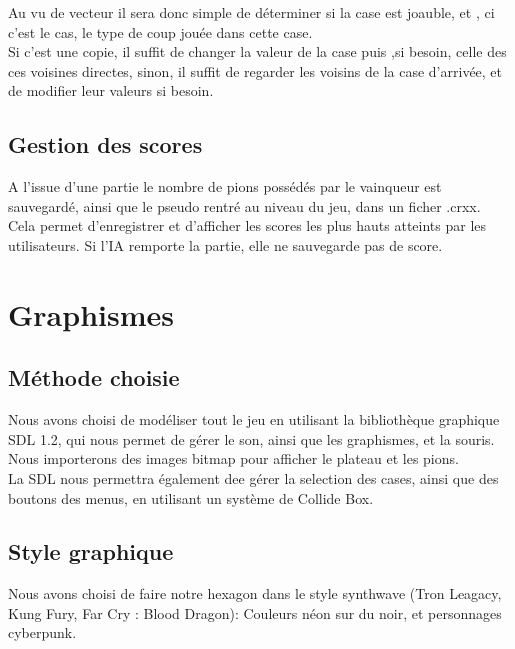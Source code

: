\documentclass{report}
\begin{document}
	Au vu de vecteur il sera donc simple de déterminer si la case est joauble, et , ci c'est le cas, le type de coup jouée dans cette case.\\
	Si c'est une copie, il suffit de changer la valeur de la case puis ,si besoin, celle des ces voisines directes, sinon, il suffit de regarder les voisins de la case d'arrivée, et de modifier leur valeurs si besoin.

	\subsection{Gestion des scores}
	
	A l'issue d'une partie le nombre de pions possédés par le vainqueur est sauvegardé, ainsi que le pseudo rentré au niveau du jeu, dans un ficher .crxx.
	Cela permet d'enregistrer et d'afficher les scores les plus hauts atteints par les utilisateurs. Si l'IA remporte la partie, elle ne sauvegarde pas de score. 


\section{Graphismes}
	\subsection{Méthode choisie}
	
		Nous avons choisi de modéliser tout le jeu en utilisant la bibliothèque graphique SDL 1.2, qui nous permet de gérer le son, ainsi que les graphismes, et la souris. Nous importerons des images bitmap pour afficher le plateau et les pions.\\
		
		La SDL nous permettra également dee gérer la selection des cases, ainsi que des boutons des menus, en utilisant un système de Collide Box.
	
	\subsection{Style graphique}
	
		Nous avons choisi de faire notre hexagon dans le style synthwave (Tron Leagacy, Kung Fury, Far Cry : Blood Dragon): Couleurs néon sur du noir, et personnages cyberpunk.
\end{document}
